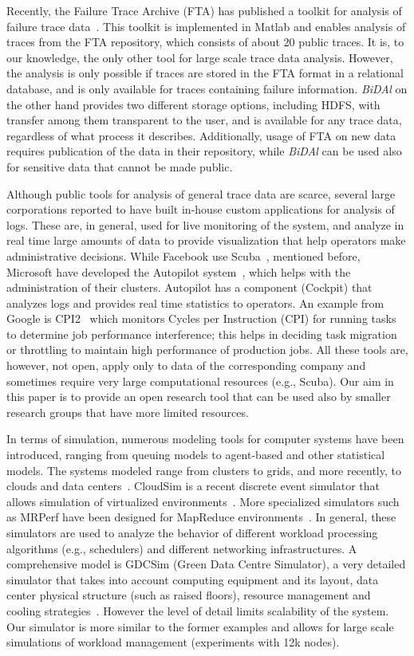\documentclass{article}
\begin{document}
Recently, the Failure Trace Archive (FTA) has published a toolkit for analysis of failure trace data~\cite{Javadi2013}. This toolkit is implemented in Matlab and enables analysis of traces from the FTA repository, which consists of about 20 public traces. It is, to our knowledge, the only other tool for large scale trace data analysis. However, the analysis is only possible if traces are stored in the FTA format in a relational database, and is only available for traces containing failure information. \emph{BiDAl} on the other hand provides two different storage options, including HDFS, with transfer among them transparent to the user, and is available for any trace data, regardless of what process it describes. Additionally, usage of FTA on new data requires publication of the data in their repository, while \emph{BiDAl} can be used also for sensitive data that cannot be made public. 

Although public tools for analysis of general trace data are scarce, several large corporations reported to have built in-house custom applications for analysis of logs. These are, in general, used for live monitoring of the system, and analyze in real time large amounts of data to provide visualization that help operators make administrative decisions. While Facebook use Scuba~\cite{Abraham2013}, mentioned before, Microsoft have developed the Autopilot system~\cite{Isard2007}, which helps with the administration of their clusters. Autopilot has a component (Cockpit) that analyzes logs and provides real time statistics to operators. An example from Google is CPI2~\cite{Hagmann2013} which monitors Cycles per Instruction (CPI) for running tasks to determine job performance interference; this helps in deciding task migration or throttling to maintain high performance of production jobs. All these tools are, however, not open, apply only to data of the corresponding company and sometimes require very large computational resources (e.g., Scuba). Our aim in this paper is to provide an open research tool that can be used also by smaller research groups that have more limited resources.

In terms of simulation, numerous modeling tools for computer systems have been introduced, ranging from queuing models to agent-based and other statistical models. The systems modeled range from clusters to grids, and more recently, to clouds and data centers~\cite{Zhao2012}. CloudSim is a recent discrete event simulator that allows simulation of virtualized environments~\cite{Calheiros2011}. More specialized simulators such as MRPerf have been designed for MapReduce environments~\cite{Wang2009}. In general, these simulators are used to analyze the behavior of different workload processing algorithms (e.g., schedulers) and different networking infrastructures. A comprehensive model is GDCSim (Green Data Centre Simulator), a very detailed simulator that takes into account computing equipment and its layout, data center physical structure (such as raised floors), resource management and cooling strategies~\cite{Gupta2011}. However the level of detail limits scalability of the system. Our simulator is more similar to the former examples and allows for large scale simulations of workload management (experiments with 12k nodes). 
\end{document}
